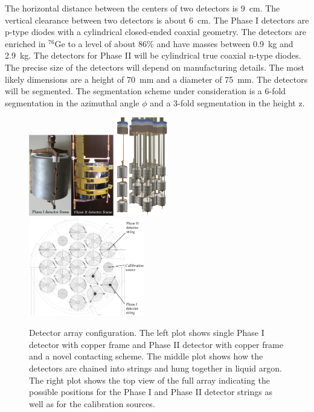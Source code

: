 The horizontal distance between the centers of two detectors is 9~cm. The vertical clearance between two detectors is about 6~cm. The Phase I detectors are p-type diodes with a cylindrical closed-ended coaxial geometry. The detectors are enriched in $^{76}$Ge to a level of about 86\% and have masses between 0.9~kg and 2.9~kg. The detectors for Phase II will be cylindrical true coaxial n-type diodes. The precise size of the detectors will depend on manufacturing details. The most likely dimensions are a height of 70~mm and a diameter of 75~mm. The detectors will be segmented. The segmentation scheme under consideration is a 6-fold segmentation in the azimuthal angle $\phi$ and a 3-fold segmentation in the height z. 

\begin{figure}[tbhp]
  \centering
  \includegraphics[width=0.33\textwidth]{detectorFrame}
  \includegraphics[width=0.2\textwidth]{array}   \includegraphics[width=0.45\textwidth]{arrayTop}
  \caption{Detector array configuration. The left plot shows single     Phase I detector with copper frame and Phase II detector with     copper frame and a novel contacting scheme. The middle plot shows     how the detectors are chained into strings and hung together in     liquid argon.  The right plot shows the top view of the full array     indicating the possible positions for the Phase I and Phase II     detector strings as well as for the calibration sources.}
  \label{fig:array}
\end{figure}

